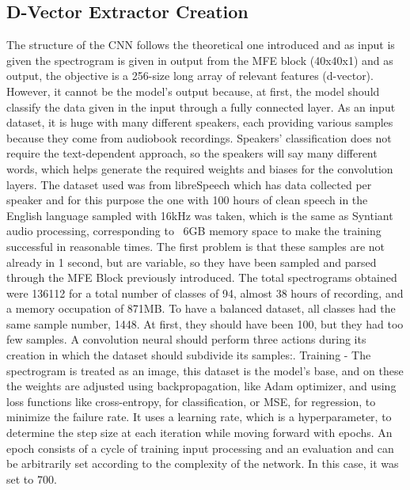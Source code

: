 \subsection{D-Vector Extractor Creation}
\label{subsec:d-vector extractor creation}
The structure of the CNN follows the theoretical one introduced and as input is given the spectrogram is given in output from the MFE block (40x40x1) and as output, the objective is a 256-size long array of relevant features (d-vector). However, it cannot be the model's output because, at first, the model should classify the data given in the input through a fully connected layer. As an input dataset, it is huge with many different speakers, each providing various samples because they come from audiobook recordings. Speakers' classification does not require the text-dependent approach, so the speakers will say many different words, which helps generate the required weights and biases for the convolution layers. The dataset used was from libreSpeech which has data collected per speaker and for this purpose the one with 100 hours of clean speech in the English language sampled with 16kHz was taken, which is the same as Syntiant audio processing\cite{librispeech}, corresponding to ~6GB memory space to make the training successful in reasonable times.\newline
The first problem is that these samples are not already in 1 second, but are variable, so they have been sampled and parsed through the MFE Block previously introduced. The total spectrograms obtained were 136112 for a total number of classes of 94, almost 38 hours of recording, and a memory occupation of 871MB. To have a balanced dataset, all classes had the same sample number, 1448. At first, they should have been 100, but they had too few samples. A convolution neural should perform three actions during its creation in which the dataset should subdivide its samples:\newline{}. Training - The spectrogram is treated as an image, this dataset is the model's base, and on these the weights are adjusted using backpropagation, like Adam optimizer, and using loss functions like cross-entropy, for classification, or MSE, for regression, to minimize the failure rate. It uses a learning rate, which is a hyperparameter, to determine the step size at each iteration while moving forward with epochs. An epoch consists of a cycle of training input processing and an evaluation and can be arbitrarily set according to the complexity of the network. In this case, it was set to 700.
